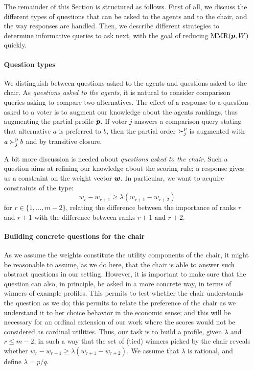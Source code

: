The remainder of this Section is structured as follows.
First of all, we discuss the different types of questions that can be asked to the agents and to the chair, and the way responses are handled.
Then, we describe different strategies to determine informative queries to ask next, with the goal of reducing $\operatorname{MMR}({\bm{p}},W)$ quickly.

\paragraph{Question types}
We distinguish between questions asked to the agents and questions asked to the chair.
As {\em questions asked to the agents}, it is natural to consider comparison queries asking to compare two alternatives.
The effect of a response to a question asked to a voter is to augment our knowledge about the agents rankings, thus augmenting the partial profile ${\bm{p}}$. 
If voter $j$ answers a comparison query stating that alternative $a$ is preferred to $b$, then the partial order $\succ^\text{p}_j$ is augmented with $a \succ^\text{p}_j b$ and by transitive closure.

A bit more discussion is needed about {\em questions asked to the chair}.
Such a question aims at refining our knowledge about the scoring rule;
a response gives us a constraint on the weight vector $\bm{w}$.
In particular, we want to acquire constraints of the type:
\[ w_{r} - w_{r+1} \geq \lambda (w_{r+1} - w_{r+2}) \] 
for $r \in \{1,\ldots,m-2\}$, relating the difference between the importance of ranks $r$ and $r+1$ with the difference between ranks $r+1$ and $r+2$.

\paragraph{Building concrete questions for the chair}
As we assume the weights constitute the utility components of the chair, it might be reasonable to assume, as we do here, that the chair is able to answer such abstract questions in our setting. However, it is important to make sure that the question can also, in principle, be asked in a more concrete way, in terms of winners of example profiles. This permits to test whether the chair understands the question as we do; this permits to relate the preference of the chair as we understand it to her choice behavior in the economic sense; and this will be necessary for an ordinal extension of our work where the scores would not be considered as cardinal utilities.
Thus, our task is to build a profile, given $\lambda$ and $r ≤ m-2$, in such a way that the set of (tied) winners picked by the chair reveals whether $w_{r} - w_{r+1} \geq \lambda (w_{r+1} - w_{r+2})$.
We assume that $\lambda$ is rational, and define $\lambda = p/q$.

